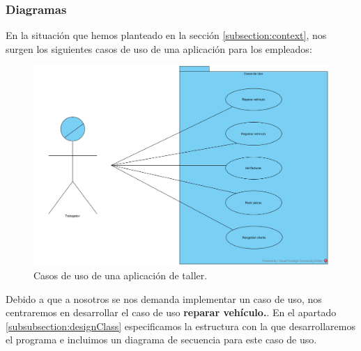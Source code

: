 \documentclass{article}
\begin{document}
\subsubsection{Diagramas}
En la situación que hemos planteado en la sección \ref{subsection:context}, nos surgen los siguientes casos de uso de una aplicación para los empleados:
\begin{figure}[H]
  \centering
  \includegraphics[width=1.0\textwidth]{misc/CasosDeUsoTalleresGutierrez.png}
  \caption{Casos de uso de una aplicación de taller.}
\end{figure}
Debido a que a nosotros se nos demanda implementar un caso de uso, nos centraremos en desarrollar el caso de uso \textbf{reparar vehículo.}.
En el apartado \ref{subsubsection:designClass} especificamos la estructura con la que desarrollaremos el programa e incluimos un diagrama de secuencia para este caso de uso. 
\end{document}
